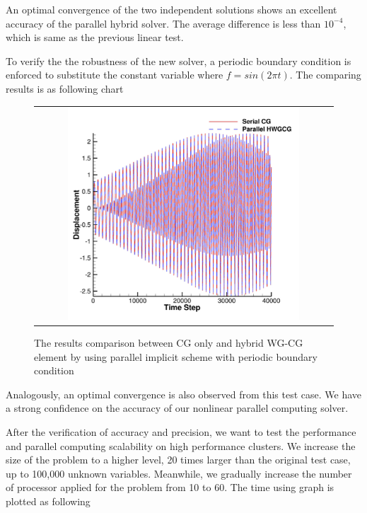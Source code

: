   An optimal convergence of the two independent solutions shows an excellent accuracy of the parallel hybrid solver. The average difference is less than $ 10^{-4} $, which is same as the previous linear test.
  
  To verify the the robustness of the new solver, a periodic boundary condition is enforced to substitute the constant variable where $ f = sin (2 \pi t) $. The comparing results is as following chart
  
    \begin{figure}[H]
    	\centering
    	\begin{tabular}{c}
    		\includegraphics[width=0.8\textwidth]{./pics/result1d5.png}
    	\end{tabular}
    	\caption{\footnotesize The results comparison between CG only and hybrid WG-CG element by using parallel implicit scheme with periodic boundary condition}
    \end{figure}
    
    Analogously, an optimal convergence is also observed from this test case. We have a strong confidence on the accuracy of our nonlinear parallel computing solver. 
    
    After the verification of accuracy and precision, we want to test the performance and parallel computing scalability on high performance clusters. We increase the size of the problem to a higher level, 20 times larger than the original test case, up to 100,000 unknown variables. Meanwhile, we gradually increase the number of processor applied for the problem from 10 to 60. The time using graph is plotted as following
    
